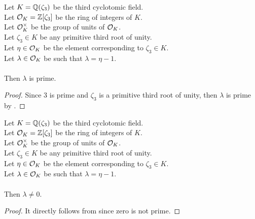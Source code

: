 \begin{lemma}
    \label{lmm:lambda_prime}
    \leanok
    Let $K = \mathbb{Q}(\zeta_3)$ be the third cyclotomic field. \\
    Let $\mathcal{O}_K = \mathbb{Z}[\zeta_3]$ be the ring of integers of $K$. \\
    Let $\mathcal{O}^\times_K$ be the group of units of $\mathcal{O}_K$. \\
    Let $\zeta_3 \in K$ be any primitive third root of unity. \\
    Let $\eta \in \mathcal{O}_K$ be the element corresponding to $\zeta_3 \in K$. \\
    Let $\lambda \in \mathcal{O}_K$ be such that $\lambda = \eta -1$. \\\\
    Then $\lambda$ is prime.
\end{lemma}
\begin{proof}
    \leanok
    Since $3$ is prime and $\zeta_3$ is a primitive third root of unity, then $\lambda$ is prime
    by .
\end{proof}

\begin{lemma}
    \label{lmm:lambda_ne_zero}
    \leanok
    Let $K = \mathbb{Q}(\zeta_3)$ be the third cyclotomic field. \\
    Let $\mathcal{O}_K = \mathbb{Z}[\zeta_3]$ be the ring of integers of $K$. \\
    Let $\mathcal{O}^\times_K$ be the group of units of $\mathcal{O}_K$. \\
    Let $\zeta_3 \in K$ be any primitive third root of unity. \\
    Let $\eta \in \mathcal{O}_K$ be the element corresponding to $\zeta_3 \in K$. \\
    Let $\lambda \in \mathcal{O}_K$ be such that $\lambda = \eta -1$. \\\\
    Then $\lambda \neq 0$.
\end{lemma}
\begin{proof}
    \leanok
    It directly follows from  since zero is not prime.
\end{proof}

